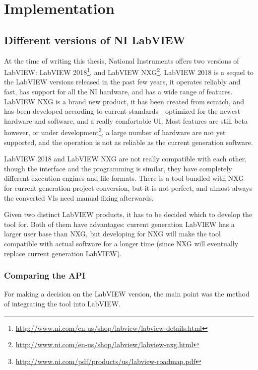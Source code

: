 \chapter{Implementation}
\label{chap:implementation}
\section{Different versions of NI LabVIEW}
At the time of writing this thesis, National Instruments offers two versions of LabVIEW: LabVIEW 2018\footnote{\url{http://www.ni.com/en-us/shop/labview/labview-details.html}}, and LabVIEW NXG\footnote{\url{http://www.ni.com/en-us/shop/labview/labview-nxg.html}}. LabVIEW 2018 is a sequel to the LabVIEW versions released in the past few years, it operates reliably and fast, has support for all the NI hardware, and has a wide range of features. LabVIEW NXG is a brand new product, it has been created from scratch, and has been developed according to current standards - optimized for the newest hardware and software, and a really comfortable UI. Most features are still beta however, or under development\footnote{\url{http://www.ni.com/pdf/products/us/labview-roadmap.pdf}}, a large number of hardware are not yet supported, and the operation is not as reliable as the current generation software.\cite{nxg_article}

LabVIEW 2018 and LabVIEW NXG are not really compatible with each other, though the interface and the programming is similar, they have completely different execution engines and file formats. There is a tool bundled with NXG for current generation project conversion, but it is not perfect, and almost always the converted VIs need manual fixing afterwards.

Given two distinct LabVIEW products, it has to be decided which to develop the tool for. Both of them have advantages: current generation LabVIEW has a larger user base than NXG, but developing for NXG will make the tool compatible with actual software for a longer time (since NXG will eventually replace current generation LabVIEW).
\subsection{Comparing the API}
For making a decision on the LabVIEW version, the main point was the method of integrating the tool into LabVIEW. 

